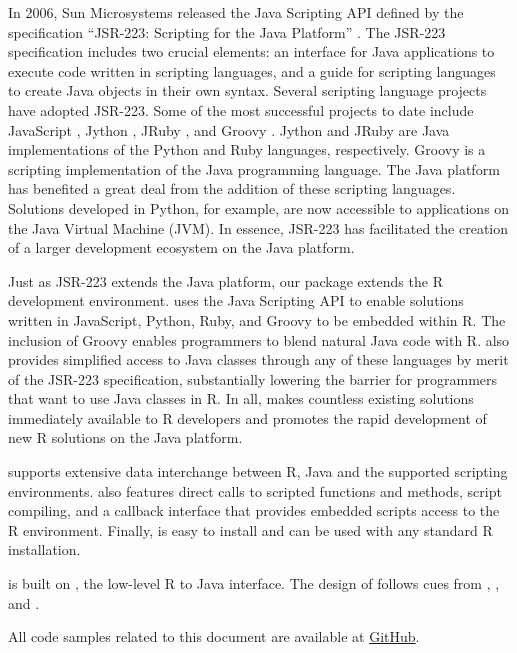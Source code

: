 In 2006, Sun Microsystems released the Java Scripting API \citep{jsa} defined by the specification “JSR-223: Scripting for the Java Platform” \citep{jsr223spec}. The JSR-223 specification includes two crucial elements: an interface for Java applications to execute code written in scripting languages, and a guide for scripting languages to create Java objects in their own syntax. Several scripting language projects have adopted JSR-223. Some of the most successful projects to date include JavaScript \citep{jsnashorn}, Jython \citep{jython}, JRuby \citep{jruby}, and Groovy \citep{groovy}. Jython and JRuby are Java implementations of the Python \citep{python} and Ruby \citep{ruby} languages, respectively. Groovy is a scripting implementation of the Java programming language. The Java platform has benefited a great deal from the addition of these scripting languages. Solutions developed in Python, for example, are now accessible to applications on the Java Virtual Machine (JVM). In essence, JSR-223 has facilitated the creation of a larger development ecosystem on the Java platform.

Just as JSR-223 extends the Java platform, our  package extends the R development environment.  uses the Java Scripting API to enable solutions written in JavaScript, Python, Ruby, and Groovy to be embedded within R. The inclusion of Groovy enables programmers to blend natural Java code with R.  also provides simplified access to Java classes through any of these languages by merit of the JSR-223 specification, substantially lowering the barrier for programmers that want to use Java classes in R. In all,  makes countless existing solutions immediately available to R developers and promotes the rapid development of new R solutions on the Java platform.

 supports extensive data interchange between R, Java and the supported scripting environments.  also features direct calls to scripted functions and methods, script compiling, and a callback interface that provides embedded scripts access to the R environment. Finally,  is easy to install and can be used with any standard R installation.

 is built on  \citep{rjava}, the low-level R to Java interface. The design of  follows cues from ,  \citep{rscala}, and  \citep{v8pkg}.

All code samples related to this document are available at \href{http://notavalidaddresss////}{GitHub}.

